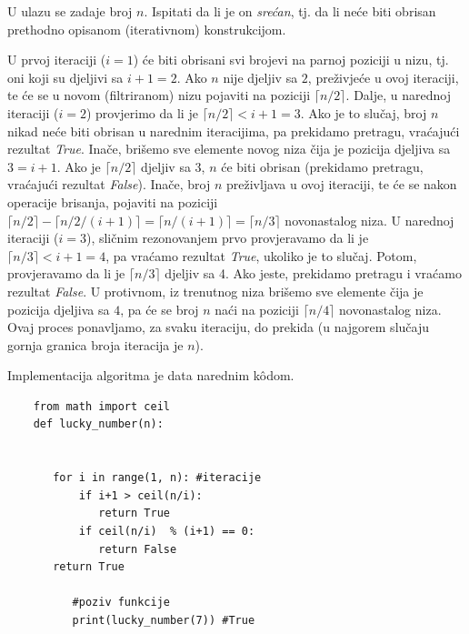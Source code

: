  U ulazu se zadaje broj $n$. Ispitati da li je on \emph{srećan}, tj. da li neće biti obrisan prethodno opisanom (iterativnom) konstrukcijom. 
 
 \begin{solution}
U prvoj iteraciji ($i=1$) će biti obrisani svi brojevi na parnoj poziciji u nizu, tj. oni koji su djeljivi sa $i+1=2$. Ako $n$ nije djeljiv sa $2$, preživjeće u ovoj iteraciji, te će se u novom (filtriranom) nizu pojaviti na poziciji $\lceil n/2 \rceil$. Dalje, u narednoj iteraciji ($i=2$) provjerimo da li je $\lceil n/2 \rceil < i+1=3$. Ako je to slučaj, broj $n$ nikad neće biti obrisan u narednim iteracijima, pa prekidamo pretragu, vraćajući rezultat \emph{True}. Inače, brišemo sve elemente novog niza čija je pozicija djeljiva sa $3=i+1$. Ako je $\lceil n/2 \rceil$ djeljiv sa 3, $n$ će biti obrisan (prekidamo pretragu, vraćajući rezultat \emph{False}). Inače, broj $n$ preživljava u ovoj iteraciji, te će se nakon operacije brisanja, pojaviti na poziciji $\lceil n/2 \rceil - \lceil n/2 /(i+1)\rceil = \lceil n/(i+1) \rceil = \lceil n/3 \rceil$ novonastalog niza. U narednoj iteraciji ($i=3$), sličnim rezonovanjem prvo provjeravamo da li je $\lceil n/3 \rceil < i+1=4$, pa vraćamo rezultat \emph{True}, ukoliko je to slučaj. Potom, provjeravamo da li je
 $\lceil n/3 \rceil$ djeljiv sa 4. Ako jeste, prekidamo pretragu i vraćamo rezultat \emph{False}. U protivnom, iz trenutnog niza brišemo sve elemente čija je pozicija djeljiva sa $4$, pa će se broj $n$ naći na poziciji $\lceil n/4 \rceil$ novonastalog niza. Ovaj proces ponavljamo, za svaku iteraciju, do prekida (u najgorem slučaju gornja granica broja iteracija je $n$).  
 
 
 Implementacija algoritma je data narednim k\^odom. 
 
 \begin{verbatim}
 	from math import ceil
 	def lucky_number(n):
 
 	      
 	   for i in range(1, n): #iteracije
 	       if i+1 > ceil(n/i):
 	          return True 
 	       if ceil(n/i)  % (i+1) == 0:
 	          return False
 	   return True       
    
          #poziv funkcije
          print(lucky_number(7)) #True	       
  
 \end{verbatim}
  
 \end{solution}
 
